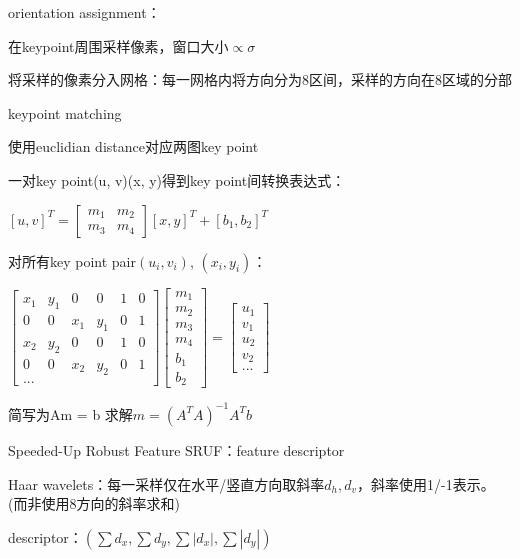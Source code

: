 \documentclass[UTF8]{ctexart}
\begin{document}
  \quad orientation assignment：

  \quad \quad 在keypoint周围采样像素，窗口大小$\propto \sigma$

  \quad \quad 将采样的像素分入网格：每一网格内将方向分为8区间，采样的方向在8区域的分部

  \quad keypoint matching

  \quad \quad 使用euclidian distance对应两图key point

  \quad \quad 一对key point(u, v)(x, y)得到key point间转换表达式：

  \quad \quad \quad $[u, v]^T = 
    \begin{bmatrix}
      m_1 & m_2 \\
      m_3 & m_4
      \end{bmatrix}
    [x, y]^T + [b_1, b_2]^T$

  \quad \quad \quad 对所有key point pair$(u_i, v_i)$, $(x_i, y_i)$：

  \quad \quad \quad $
    \begin{bmatrix}
      x_1 & y_1 & 0 & 0 & 1 & 0 \\
      0 & 0 & x_1 & y_1 & 0 & 1 \\
      x_2 & y_2 & 0 & 0 & 1 & 0 \\
      0 & 0 & x_2 & y_2 & 0 & 1 \\
      ... 
      \end{bmatrix}
    \begin{bmatrix}
      m_1 \\
      m_2 \\
      m_3 \\ 
      m_4 \\
      b_1 \\
      b_2
      \end{bmatrix}
    =
    \begin{bmatrix}
      u_1 \\
      v_1 \\
      u_2 \\ 
      v_2 \\
      ...
      \end{bmatrix}$

  \quad \quad \quad 简写为Am = b
  \quad \quad \quad 求解$m = (A^TA)^{-1}A^Tb$
  
  Speeded-Up Robust Feature SRUF：feature descriptor

  \quad Haar wavelets：每一采样仅在水平/竖直方向取斜率$d_h, d_v$，斜率使用1/-1表示。(而非使用8方向的斜率求和)

  \quad descriptor：$(\sum d_x, \sum d_y, \sum |d_x|, \sum |d_y|)$
\end{document}
